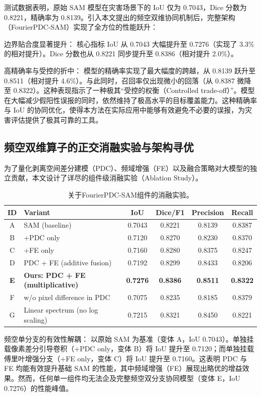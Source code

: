 测试数据表明，原始 SAM 模型在灾害场景下的 IoU 仅为 0.7043，Dice 分数为 0.8221，精确率为 0.8139。引入本文提出的频空双维协同机制后，完整架构（FourierPDC-SAM）实现了全方位的性能跃升：

边界贴合度显著提升： 核心指标 IoU 从 0.7043 大幅提升至 0.7276（实现了 3.3\% 的相对提升）。Dice 分数也从 0.8221 同步提升至 0.8386（相对提升 2.0\%）。

高精确率与受控的折中： 模型的精确率实现了最大幅度的跨越，从 0.8139 跃升至 0.8511（相对提升 4.6\%）。与此同时，召回率仅出现微小的回落（从 0.8387 微降至 0.8322）。这种表现指示了一种极其“受控的权衡（Controlled trade-off）”。模型在大幅减少假阳性误报的同时，依然维持了极高水平的目标覆盖能力。这种精确率与 IoU 的协同优化，使得本方法在实际应用中能够有效避免不必要的误报，为灾害评估提供了极其可靠的工具。

\subsection{频空双维算子的正交消融实验与架构寻优}
为了量化剥离空间差分建模（PDC）、频域增强（FE）以及融合策略对大模型的独立贡献，本文设计了详尽的组件级消融实验（Ablation Study）。

\begin{table}[htbp]
\centering
\caption{关于FourierPDC-SAM组件的消融实验。}
\label{tab:ablation_fourierpdc_sam}
\begin{tabular}{c l c c c c}
\toprule
ID & Variant & IoU & Dice/F1 & Precision & Recall \\
\midrule
A & SAM (baseline)                   & 0.7043 & 0.8221 & 0.8139 & 0.8387 \\
B & +PDC only                        & 0.7120 & 0.8270 & 0.8230 & 0.8370 \\
C & +FE only                         & 0.7160 & 0.8280 & 0.8375 & 0.8247 \\
D & PDC + FE (additive fusion)       & 0.7192 & 0.8299 & 0.8433 & 0.8206 \\
\textbf{E} & \textbf{Ours: PDC + FE (multiplicative)} & \textbf{0.7276} & \textbf{0.8386} & \textbf{0.8511} & \textbf{0.8322} \\
F & w/o pixel difference in PDC      & 0.7075 & 0.8235 & 0.8185 & 0.8379 \\
G & Linear spectrum (no log scaling) & 0.7215 & 0.8321 & 0.8450 & 0.8221 \\
\bottomrule
\end{tabular}
\end{table}

频空单分支的有效性解耦： 以原始 SAM 为基准（变体 A，IoU 0.7043）。单独挂载像素差分引导卷积（+PDC only，变体 B）将 IoU 提升至 0.7120；而单独挂载傅里叶增强分支（+FE only，变体 C）将 IoU 提升至 0.7160。这表明 PDC 与 FE 均能有效提升基础 SAM 的性能，其中频域增强（FE）展现出略优的增益效果。然而，任何单一组件均无法企及完整频空双分支协同模型（变体 E，IoU 0.7276）的性能峰值。

